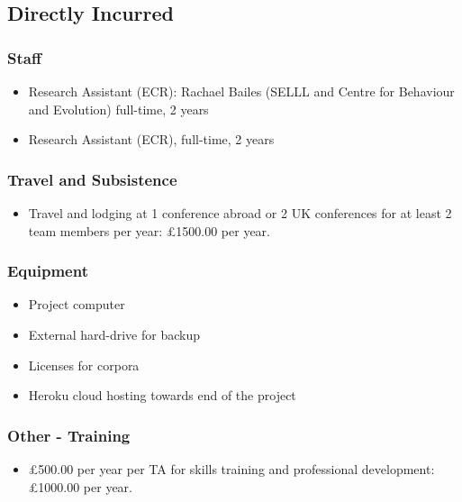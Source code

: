 \documentclass[11pt]{article}
\begin{document}
\subsection{Directly Incurred}

\subsubsection{Staff}

\begin{itemize}
	\item Research Assistant (ECR): Rachael Bailes (SELLL and Centre for Behaviour and Evolution) full-time, 2 years
	
	\item Research Assistant (ECR), full-time, 2 years
\end{itemize}


\subsubsection{Travel and Subsistence}

\begin{itemize}
	\item Travel and lodging at 1 conference abroad or 2 UK conferences for at least 2 team members per year: £1500.00 per year.
\end{itemize}


\subsubsection{Equipment}

\begin{itemize}
	\item Project computer 
	\item External hard-drive for backup
	\item Licenses for corpora
	\item Heroku cloud hosting towards end of the project
\end{itemize}

\subsubsection{Other - Training}

\begin{itemize}
	\item £500.00 per year per TA for skills training and professional development: £1000.00 per year.
\end{itemize}
\end{document}
